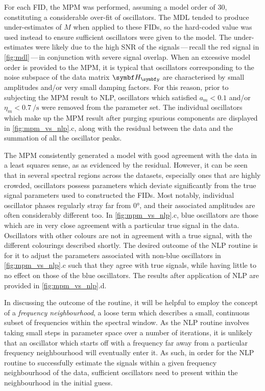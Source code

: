 For each \ac{FID}, the \ac{MPM} was performed, assuming a model order of
30, constituting a considerable over-fit of oscillators. The \ac{MDL} tended to
produce under-estimates of $M$ when applied to these \acp{FID}, so the
hard-coded value was used instead to ensure sufficient oscillators were given
to the model. The under-estimates were likely due to the
high \ac{SNR} of the signals\,---\,recall the red signal in \cref{fig:mdl}\,---\,in
conjunction with severe signal overlap. When an excessive model order is
provided to the \ac{MPM}, it is typical that oscillators corresponding to the
noise subspace of the data matrix $\Hy$ are characterised by small amplitudes
and/or very small damping factors. For this reason, prior to subjecting the
\ac{MPM} result to \ac{NLP}, oscillators which satisfied $a_m < 0.1$ and/or
$\eta_m < \qty{0.7}{\per\second}$ were removed from the parameter set. The
individual oscillators which make up the \ac{MPM} result after purging spurious
components are displayed in \cref{fig:mpm_vs_nlp}.c, along with the
residual between the data and the summation of all the oscillator peaks.

The \ac{MPM} consistently generated a model with good agreement with the data
in a least squares sense, as as evidenced by the residual.
However, it can be seen that in several spectral regions across the datasets,
especially ones that are highly crowded, oscillators possess parameters which
deviate significantly from the true signal parameters used to constructed the
\acp{FID}.
Most notably, individual oscillator phases regularly stray far from \ang{0},
and their associated amplitudes are often considerably different too.
In \cref{fig:mpm_vs_nlp}.c, blue oscillators are those which
are in very close agreement with a particular true signal in the data.
Oscillators with other colours are not in agreement with a true signal,
with the different colourings described shortly.
The desired outcome of the \ac{NLP} routine is for it to adjust the
parameters associated with non-blue oscillators in \cref{fig:mpm_vs_nlp}.c such
that they agree with true signals, while having little to no effect on those of
the blue oscillators. The results after application of \ac{NLP} are provided in
\cref{fig:mpm_vs_nlp}.d.

In discussing the outcome of the routine, it will be helpful to employ the
concept of a \emph{frequency neighbourhood}, a loose term which describes a
small, continuous subset of frequencies within the spectral window. As the
\ac{NLP} routine involves taking small steps
in parameter space over a number of iterations, it is unlikely that an
oscillator which starts off with a frequency far away from a particular
frequency neighbourhood will eventually enter it. As such, in order for the
\ac{NLP} routine to successfully estimate the signals within a given frequency
neighbourhood of the data, sufficient oscillators need to present within the
neighbourhood in the initial guess.

